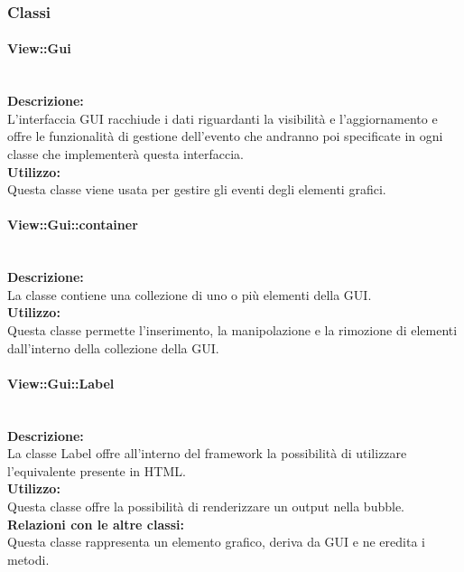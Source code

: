 \subsubsection{Classi}

\paragraph{View::Gui}\label{gui}\mbox{}\\
\textbf{Descrizione:}\\
L'interfaccia GUI racchiude i dati riguardanti la visibilità e l'aggiornamento e offre le funzionalità di gestione dell'evento che andranno poi specificate in ogni classe che implementerà questa interfaccia.\\
\textbf{Utilizzo:}\\
Questa classe viene usata per gestire gli eventi degli elementi grafici.

\paragraph{View::Gui::container}\label{gui-container}\mbox{}\\
\textbf{Descrizione:}\\
La classe contiene una collezione di uno o più elementi della GUI.\\ 
\textbf{Utilizzo:}\\
Questa classe permette l'inserimento, la manipolazione e la rimozione di elementi dall'interno della collezione della GUI. 

\paragraph{View::Gui::Label}\label{gui-label}\mbox{}\\
\textbf{Descrizione:}\\
La classe Label offre all'interno del framework la possibilità di utilizzare l'equivalente presente in HTML.\\
\textbf{Utilizzo:}\\
Questa classe offre la possibilità di renderizzare un output nella bubble.\\
\textbf{Relazioni con le altre classi:}\\
Questa classe rappresenta un elemento grafico, deriva da GUI e ne eredita i metodi.\\

